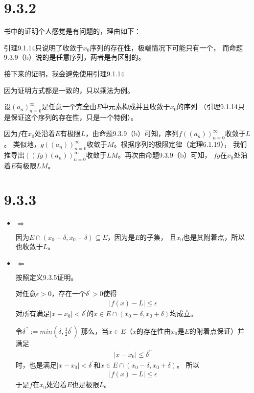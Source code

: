 \documentclass{article}
\begin{document}
\section*{9.3.2}

\begin{zremark}
  书中的证明个人感觉是有问题的，理由如下：

  引理9.1.14只说明了收敛于$x_0$序列的存在性，极端情况下可能只有一个，
  而命题9.3.9（b）说的是任意序列，两者是有区别的。

  接下来的证明，我会避免使用引理9.1.14
\end{zremark}

因为证明方式都是一致的，只以乘法为例。

设$(a_n)_{n=0}^\infty$是任意一个完全由$E$中元素构成并且收敛于$x_0$的序列
（引理9.1.14只是保证这个序列的存在性，只是一个特例）。

因为$f$在$x_0$处沿着$E$有极限$L$，由命题9.3.9（b）可知，序列$f((a_n))_{n=0}^\infty$收敛于$L$。
类似地，$g((a_n))_{n=0}^\infty$收敛于$M$。根据序列的极限定律（定理6.1.19），
我们推导出$((fg)(a_n))_{n=0}^\infty$收敛于$LM$。再次由命题9.3.9（b）可知，
$fg$在$x_0$处沿着$E$有极限$LM$。

\section*{9.3.3}

\begin{itemize}
  \item $\Rightarrow$

        因为$ E \cap (x_0 - \delta, x_0 + \delta) \subseteq E$，因为是$E$的子集，
        且$x_0$也是其附着点，所以也收敛于$L$。
  \item $\Leftarrow$

        按照定义9.3.5证明。

        对任意$\epsilon > 0$，存在一个$\delta^\prime > 0$使得
        \begin{align*}
          |f(x) - L| \leq \epsilon
        \end{align*}
        对所有满足$|x - x_0| < \delta^\prime$的$x \in E \cap (x_0 - \delta, x_0 + \delta)$均成立。

        令$\delta^{\prime\prime} := min(\delta, \frac{1}{2}\delta^\prime)$
        那么，当$x \in E$（$x$的存在性由$x_0$是$E$的附着点保证）并满足
        \begin{align*}
          |x - x_0| \leq \delta^{\prime\prime}
        \end{align*}
        时，也是满足$|x - x_0| < \delta^\prime$和$x \in E \cap (x_0 - \delta, x_0 + \delta)$。
        所以
        \begin{align*}
          |f(x) - L| \leq \epsilon
        \end{align*}
        于是$f$在$x_0$处沿着$E$也是极限$L$。
\end{itemize}
\end{document}
